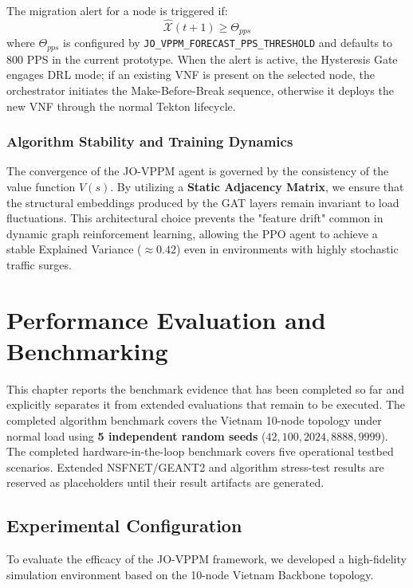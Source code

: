 \documentclass[12pt, a4paper, reqno, oneside]{book}
\begin{document}
The migration alert for a node is triggered if:
\begin{equation}
\hat{\mathcal{X}}(t+1) \ge \Theta_{pps}
\end{equation}
where $\Theta_{pps}$ is configured by \texttt{JO\_VPPM\_FORECAST\_PPS\_THRESHOLD} and defaults to 800 PPS in the current prototype. When the alert is active, the Hysteresis Gate engages DRL mode; if an existing VNF is present on the selected node, the orchestrator initiates the Make-Before-Break sequence, otherwise it deploys the new VNF through the normal Tekton lifecycle.

\subsection{Algorithm Stability and Training Dynamics}
The convergence of the JO-VPPM agent is governed by the consistency of the value function $V(s)$. By utilizing a \textbf{Static Adjacency Matrix}, we ensure that the structural embeddings produced by the GAT layers remain invariant to load fluctuations. This architectural choice prevents the "feature drift" common in dynamic graph reinforcement learning, allowing the PPO agent to achieve a stable Explained Variance ($\approx 0.42$) even in environments with highly stochastic traffic surges.



\chapter{Performance Evaluation and Benchmarking}
\label{chap:experiments}

This chapter reports the benchmark evidence that has been completed so far and explicitly separates it from extended evaluations that remain to be executed. The completed algorithm benchmark covers the Vietnam 10-node topology under normal load using \textbf{5 independent random seeds} ($42, 100, 2024, 8888, 9999$). The completed hardware-in-the-loop benchmark covers five operational testbed scenarios. Extended NSFNET/GEANT2 and algorithm stress-test results are reserved as placeholders until their result artifacts are generated.

\section{Experimental Configuration}
To evaluate the efficacy of the JO-VPPM framework, we developed a high-fidelity simulation environment based on the 10-node Vietnam Backbone topology.
\end{document}
